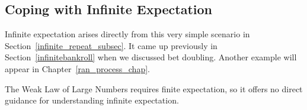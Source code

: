 \begin{editingnotes}
\subsection{Coping with Infinite Expectation}

Infinite expectation arises directly from this very simple scenario in
Section~\ref{infinite_repeat_subsec}.  It came up previously in
Section~\ref{infinitebankroll} when we discussed bet doubling.
Another example will appear in Chapter~\ref{ran_process_chap}.

The Weak Law of Large Numbers requires finite expectation, so it
offers no direct guidance for understanding infinite expectation.
\end{editingnotes}


\begin{problems}
\practiceproblems
{}

\classproblems
{}

\examproblems
{}
\end{problems}

\endinput


